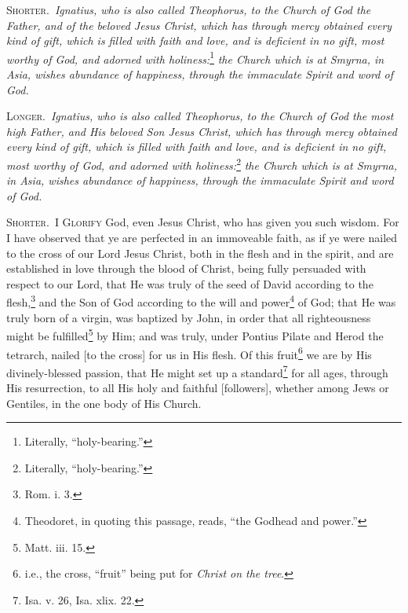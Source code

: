 
\textsc{Shorter.}~\emph{Ignatius, who is also called Theophorus, to the Church of God the Father, and of the beloved Jesus Christ, which has through mercy obtained every kind of gift, which is filled with faith and love, and is deficient in no gift, most worthy of God, and adorned with holiness:}\footnote{Literally, “holy-bearing.”}\emph{ the Church which is at Smyrna, in Asia, wishes abundance of happiness, through the immaculate Spirit and word of God.}

\textsc{Longer.}~\emph{Ignatius, who is also called Theophorus, to the Church of God the most high Father, and His beloved Son Jesus Christ, which has through mercy obtained every kind of gift, which is filled with faith and love, and is deficient in no gift, most worthy of God, and adorned with holiness:}\footnote{Literally, “holy-bearing.”}\emph{ the Church which is at Smyrna, in Asia, wishes abundance of happiness, through the immaculate Spirit and word of God.}


\textsc{Shorter.}~\textsc{I Glorify} God, even Jesus Christ, who has given you such wisdom. For I have observed that ye are perfected in an immoveable faith, as if ye were nailed to the cross of our Lord Jesus Christ, both in the flesh and in the spirit, and are established in love through the blood of Christ, being fully persuaded with respect to our Lord, that He was truly of the seed of David according to the flesh,\footnote{Rom. i. 3.} and the Son of God according to the will and power\footnote{Theodoret, in quoting this passage, reads, “the Godhead and power.”} of God; that He was truly born of a virgin, was baptized by John, in order that all righteousness might be fulfilled\footnote{Matt. iii. 15.} by Him; and was truly, under Pontius Pilate and Herod the tetrarch, nailed [to the cross] for us in His flesh. Of this fruit\footnote{i.e., the cross, “fruit” being put for \emph{Christ on the tree}.} we are by His divinely-blessed passion, that He might set up a standard\footnote{Isa. v. 26, Isa. xlix. 22.} for all ages, through His resurrection, to all His holy and faithful [followers], whether among Jews or Gentiles, in the one body of His Church.

